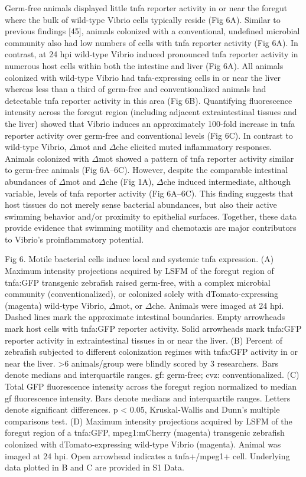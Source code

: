 Germ-free animals displayed little tnfa reporter activity in or near the foregut where the bulk of wild-type Vibrio cells typically reside (Fig 6A). Similar to previous findings [45], animals colonized with a conventional, undefined microbial community also had low numbers of cells with tnfa reporter activity (Fig 6A). In contrast, at 24 hpi wild-type Vibrio induced pronounced tnfa reporter activity in numerous host cells within both the intestine and liver (Fig 6A). All animals colonized with wild-type Vibrio had tnfa-expressing cells in or near the liver whereas less than a third of germ-free and conventionalized animals had detectable tnfa reporter activity in this area (Fig 6B). Quantifying fluorescence intensity across the foregut region (including adjacent extraintestinal tissues and the liver) showed that Vibrio induces an approximately 100-fold increase in tnfa reporter activity over germ-free and conventional levels (Fig 6C). In contrast to wild-type Vibrio, $\Delta$mot and $\Delta$che elicited muted inflammatory responses. Animals colonized with $\Delta$mot showed a pattern of tnfa reporter activity similar to germ-free animals (Fig 6A–6C). However, despite the comparable intestinal abundances of $\Delta$mot and $\Delta$che (Fig 1A), $\Delta$che induced intermediate, although variable, levels of tnfa reporter activity (Fig 6A–6C). This finding suggests that host tissues do not merely sense bacterial abundances, but also their active swimming behavior and/or proximity to epithelial surfaces. Together, these data provide evidence that swimming motility and chemotaxis are major contributors to Vibrio's proinflammatory potential. 

Fig 6. Motile bacterial cells induce local and systemic tnfa expression.
(A) Maximum intensity projections acquired by LSFM of the foregut region of tnfa:GFP transgenic zebrafish raised germ-free, with a complex microbial community (conventionalized), or colonized solely with dTomato-expressing (magenta) wild-type Vibrio, $\Delta$mot, or $\Delta$che. Animals were imaged at 24 hpi. Dashed lines mark the approximate intestinal boundaries. Empty arrowheads mark host cells with tnfa:GFP reporter activity. Solid arrowheads mark tnfa:GFP reporter activity in extraintestinal tissues in or near the liver. (B) Percent of zebrafish subjected to different colonization regimes with tnfa:GFP activity in or near the liver. >6 animals/group were blindly scored by 3 researchers. Bars denote medians and interquartile ranges. gf: germ-free; cvz: conventionalized. (C) Total GFP fluorescence intensity across the foregut region normalized to median gf fluorescence intensity. Bars denote medians and interquartile ranges. Letters denote significant differences. p < 0.05, Kruskal-Wallis and Dunn's multiple comparisons test. (D) Maximum intensity projections acquired by LSFM of the foregut region of a tnfa:GFP, mpeg1:mCherry (magenta) transgenic zebrafish colonized with dTomato-expressing wild-type Vibrio (magenta). Animal was imaged at 24 hpi. Open arrowhead indicates a tnfa+/mpeg1+ cell. Underlying data plotted in B and C are provided in S1 Data.

